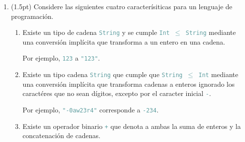 \documentclass{article}
\newcommand{\tp}[1]{\textcolor{CadetBlue} {\texttt{#1}}}
\newcommand{\tb}[1]{\textcolor{RoyalPurple} {\textbf{#1}}}
\newcommand{\ti}[1]{\textcolor{RoyalPurple} {\textit{#1}}}
\newcommand{\pt}[1]{\textcolor{RoyalPurple}{(#1pt)}}
\begin{document}
\begin{enumerate}
\begin{verbatim}
N 3 = 22 + (f 3) + 37

N 4 = g 22 (f 4)

N 4 = 22 + (f 4) + 33 + (g y)

N x = h (f x) (44 - y) (g y)
        \end{verbatim}

        Defina la versión \tp{cps} de \tp{N}, denotada por \tp{cpsN}. Para esto,
        puede suponer definidas las versiones \tp{cps} de \tp{f, g, h},
        denotadas por \tp{cpsf, cpsg, cpsh}.

        \ti{Atención:} Las operaciones aritméticas deben permanecer sin cambios.
        Es decir, no se piden las versiones \tp{cps} de \tp{+, -}.

		\tb{Solución}
		\begin{verbatim}
cpsN 0 k = 17

cpsN 1 k = cpsf (1 + 13) (\v -> k v)

cpsN 2 k = k (22 + (2-3) + 2)

cpsN 3 k = cpsf 3 (\v -> k (22 + v + 37))

cpsN 4 k = cpsg 22 (\v1 -> cpsf 4 (\v2 -> k(v1 + v2))

cpsN 5 k = cpsf 4 (\v1 -> cpsg y (\v2 -> k(22 + v1 + 33+ v2)))

cpsN x k = cpsf x (\v1 -> cpsg y (\v2 -> cpsh v1 (44 -y) v2 (\v3 -> k v3)))
		\end{verbatim}

        \item \pt{1.5} Considere las siguientes cuatro caracterísiticas para un
        lenguaje de programación.

        \begin{enumerate}
            \item Existe un tipo de cadena \tp{String} y se cumple
            \tp{Int $\leq$ String} mediante una conversión implícita que
            transforma a un entero en una cadena.

            Por ejemplo, \tp{123} a \tp{"123"}.

            \item Existe un tipo cadena \tp{String} que cumple que
            \tp{String $\leq$ Int} mediante una conversión implícita que
            transforma cadenas a enteros ignorado los caractéres que no sean
            dígitos, excepto por el caracter inicial \tp{-}.

            Por ejemplo, \tp{"}\tp{-0aw23r4"} corresponde a \tp{-234}.

            \item Existe un operador binario \tp{+} que denota a ambas la suma
            de enteros y la concatenación de cadenas.


\end{enumerate}
\end{enumerate}
\end{document}
